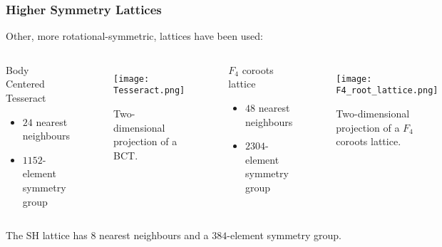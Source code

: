 \documentclass{beamer}
\begin{document}
\begin{frame}
  \frametitle{Higher Symmetry Lattices}
  Other, more rotational-symmetric, lattices have been used:\\
  \begin{columns}
    \centering
      \begin{block}{\centering
        Body Centered Tesseract
        }
        \begin{itemize}
          \item $24$ nearest neighbours
          \item $1152$-element symmetry group
        \end{itemize}
      \end{block}
      \begin{figure}
        \texttt{[image: Tesseract.png]}
        \caption{Two-dimensional projection of a BCT\cite{Celmaster:1982ht}.}
      \end{figure}
    
    \centering
      \begin{block}{\centering
          $F_4$ coroots lattice\cite{Neuberger:1987kt}
          }
          \begin{itemize}
            \item $48$ nearest neighbours
            \item $2304$-element symmetry group
          \end{itemize}
        \end{block}
      \begin{figure}
        \texttt{[image: F4\_root\_lattice.png]}
        \caption{Two-dimensional projection of a $F_4$ coroots lattice\cite{f4image}.}
      \end{figure}
  \end{columns}
  \footnotesize
  The SH lattice has $8$ nearest neighbours and a $384$-element symmetry group.
\end{frame}
\end{document}
